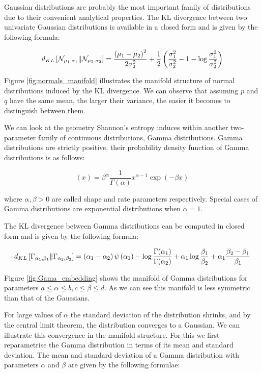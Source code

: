 Gaussian distributions are probably the most important family of distributions due to their convenient analytical properties. 
The KL divergence between two univariate Gaussian distributions is available in a closed form and is given by the following formula:

\begin{equation}
	d_{KL}\left[\mathcal{N}_{\mu_1,\sigma_1}\middle\|\mathcal{N}_{\mu_2,\sigma_2}\right] = \frac{\left(\mu_1 - \mu_2\right)^2}{2\sigma_2^2} + \frac{1}{2}\left(\frac{\sigma_1^2}{\sigma_2^2} - 1 - \log\frac{\sigma_1^2}{\sigma_2^2}\right)
\end{equation}


Figure \ref{fig:normals_manifold} illustrates the manifold structure of normal distributions induced by the KL divergence. We can observe that assuming $p$ and $q$ have the same mean, the larger their variance, the easier it becomes to distinguish between them.

We can look at the geometry Shannon's entropy induces within another two-parameter family of continuous distributions, Gamma distributions. Gamma distributions are strictly positive, their probability density function of Gamma distributions is as follows:

\begin{equation}
(x) = \beta^{\alpha}\frac{1}{\Gamma(\alpha)} x^{\alpha-1} \exp(-\beta x)
\end{equation}

where $\alpha,\beta > 0$ are called shape and rate parameters respectively. Special cases of Gamma distributions are exponential distributions when $\alpha=1$.

The KL divergence between Gamma distributions can be computed in closed form and is given by the following formula:

\begin{equation}
	d_{KL}\left[\Gamma_{\alpha_1,\beta_1}\middle\|\Gamma_{\alpha_2,\beta_2}\right] = \left(\alpha_1 - \alpha_2\right)\psi\left(\alpha_1\right) - \log\frac{\Gamma(\alpha_1)}{\Gamma(\alpha_2)} + \alpha_1\log\frac{\beta_1}{\beta_2} + \alpha_1\frac{\beta_2 - \beta_1}{\beta_1} \label{eqn:KL_Gamma}
\end{equation}

Figure \ref{fig:Gama_embedding} shows the manifold of Gamma distributions for parameters $a \leq \alpha \leq b, c\leq \beta \leq d$. As we can see this manifold is less symmetric than that of the Gaussians.

For large values of $\alpha$ the standard deviation of the distribution shrinks, and by the central limit theorem, the distribution converges to a Gaussian. We can illustrate this convergence in the manifold structure. For this we first reparametrise the Gamma distribution in terms of its mean and standard deviation. The mean and standard deviation of a Gamma distribution with parameters $\alpha$ and $\beta$ are given by the following formulae:

